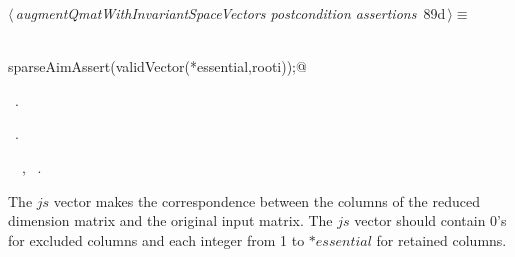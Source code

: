 \documentclass{article}
\begin{document}
\begin{flushleft} \small
\begin{minipage}{\linewidth}\label{scrap160}\raggedright\small
{} $\langle\,${\itshape augmentQmatWithInvariantSpaceVectors postcondition assertions}\nobreak\ {\footnotesize {89d}}$\,\rangle\equiv$
\vspace{-1ex}
\begin{list}{}{} \item
\mbox{}\verb@@\\
\mbox{}\verb@  sparseAimAssert(validVector(*essential,rooti));@\\
\mbox{}\verb@@{\NWsep}
\end{list}
\vspace{-1.5ex}
\footnotesize
\begin{list}{}{\setlength{\itemsep}{-\parsep}\setlength{\itemindent}{-\leftmargin}}
\item \NWtxtMacroDefBy\ .
\item \NWtxtMacroRefIn\ .
\item \NWtxtIdentsUsed\nobreak\  \verb@essential@\nobreak\ , \verb@rooti@\nobreak\ .
\item{}
\end{list}
\end{minipage}\vspace{4ex}
\end{flushleft}
The $js$ vector makes the correspondence between the columns of the
reduced dimension matrix and the original input matrix.
The $js$ vector should contain 0's for excluded columns and
 each integer from 1 to $*essential$ for retained columns.
\end{document}
